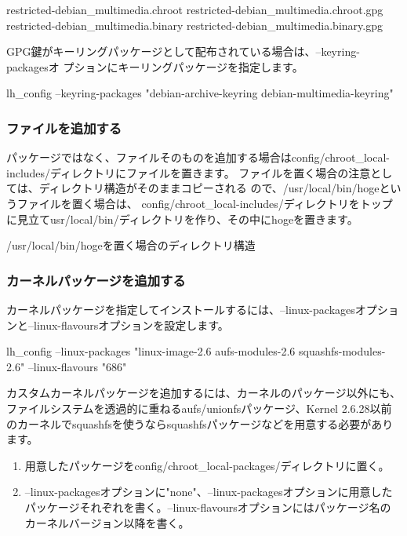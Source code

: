 \documentclass[mingoth,a4paper]{jsarticle}
\begin{document}
\begin{commandline}
 restricted-debian_multimedia.chroot
 restricted-debian_multimedia.chroot.gpg
 restricted-debian_multimedia.binary
 restricted-debian_multimedia.binary.gpg
\end{commandline}

GPG鍵がキーリングパッケージとして配布されている場合は、--keyring-packagesオ
プションにキーリングパッケージを指定します。

\begin{commandline}
 lh_config --keyring-packages "debian-archive-keyring debian-multimedia-keyring"
\end{commandline}

\subsubsection{ファイルを追加する}
パッケージではなく、ファイルそのものを追加する場合はconfig/chroot\_local-includes/ディレクトリにファイルを置きます。
ファイルを置く場合の注意としては、ディレクトリ構造がそのままコピーされる
ので、/usr/local/bin/hogeというファイルを置く場合は、
config/chroot\_local-includes/ディレクトリをトップに見立てusr/local/bin/ディレクトリを作り、その中にhogeを置きます。

/usr/local/bin/hogeを置く場合のディレクトリ構造

\subsubsection{カーネルパッケージを追加する}
カーネルパッケージを指定してインストールするには、--linux-packagesオプションと--linux-flavoursオプションを設定します。

\begin{commandline}
 lh_config --linux-packages "linux-image-2.6 aufs-modules-2.6 squashfs-modules-2.6" --linux-flavours "686"
\end{commandline} 

カスタムカーネルパッケージを追加するには、カーネルのパッケージ以外にも、ファイルシステムを透過的に重ねるaufs/unionfsパッケージ、Kernel 2.6.28以前のカーネルでsquashfsを使うならsquashfsパッケージなどを用意する必要があります。

\begin{enumerate}
 \item 用意したパッケージをconfig/chroot\_local-packages/ディレクトリに置く。
 \item --linux-packagesオプションに"none"、--linux-packagesオプションに用意したパッケージそれぞれを書く。--linux-flavoursオプションにはパッケージ名のカーネルバージョン以降を書く。
\end{enumerate}
\end{document}
